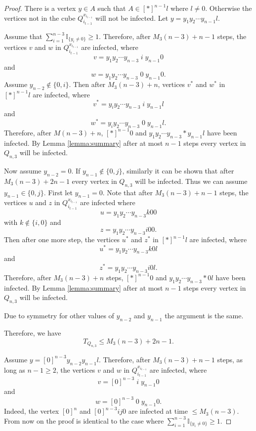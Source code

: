 \documentclass[10pt,a4paper]{amsart}
\renewcommand{\geq}{\geqslant}
\renewcommand{\leq}{\leqslant}
\begin{document}
\begin{proof}
There is a vertex $y \in A$ such that $A \in [\ast]^{n-1}l$ where $l \neq 0$. Otherwise the vertices not in the cube $Q_{i_{t-1}}^{x_{i_{t-1}}}$ will not be infected. Let $y=y_1y_2 \cdots y_{n-1}l$. 

Assume that $\sum_{i=1}^{n-3}\mathbb{I}_{\{y_i \neq 0\}} \geq 1$. Therefore, after $M_3(n-3)+n-1$ steps, the vertices $v$ and $w$ in $Q_{i_{t-1}}^{x_{i_{t-1}}}$ are infected, where 
$$v=y_1y_2\cdots y_{n-3}\;i\;y_{n-1}0$$
and 
$$w=y_1y_2\cdots y_{n-3}\;0\; y_{n-1}0.$$
Assume $y_{n-2} \notin \{0,i\}$. Then after $M_3(n-3)+n$, vertices $v^*$ and $w^*$ in $[\ast]^{n-1}l$ are infected, where 
$$v^*=y_iy_2 \cdots y_{n-3}\;i\;y_{n-1}l$$
and 
$$w^*=y_iy_2 \cdots y_{n-3}\;0\;y_{n-1}l. $$
Therefore, after $M(n-3)+n$, $[\ast]^{n-1}0$ and $y_1y_2\cdots y_{n-3}\ast y_{n-1}l$ have been infected. By Lemma \ref{lemma:summary} after at most $n-1$ steps every vertex in $Q_{n,3}$ will be infected. 

Now assume $y_{n-2}=0$. If $y_{n-1} \notin \{0,j\}$, similarly it can be shown that after $M_3(n-3)+2n-1$ every vertex in $Q_{n,3}$ will be infected. Thus we can assume $y_{n-1} \in \{0,j\}$. First let $y_{n-1}=0$. Note that after $M_3(n-3)+n-1$ steps, the vertices $u$ and $z$ in $Q_{i_{t-1}}^{x_{i_{t-1}}}$ are infected where 
$$u=y_1y_2 \cdots y_{n-3}k00$$
with $k \notin\{i,0\}$
and 
$$z=y_1y_2 \cdots y_{n-3}i00.$$
Then after one more step, the vertices $u^*$ and $z^*$ in $[\ast]^{n-1}l$ are infected, where 
$$u^*=y_1y_2 \cdots y_{n-3}k0l$$
and 
$$z^*=y_1y_2 \cdots y_{n-3}i0l.$$
Therefore, after $M_3(n-3)+n$ steps, $[\ast]^{n-1}0$ and $y_1y_2\cdots y_{n-3}\ast 0l$ have been infected. By Lemma \ref{lemma:summary} after at most $n-1$ steps every vertex in $Q_{n,3}$ will be infected. 

Due to symmetry for other values of $y_{n-2}$ and $y_{n-1}$ the argument is the same. 

Therefore, we have 
$$T_{Q_{n,3}} \leq M_3(n-3)+2n-1.$$

Assume $y=[0]^{n-3}y_{n-2}y_{n-1}l$. Therefore, after $M_3(n-3)+n-1$ steps, as long as $n-1 \geq 2$, the vertices $v$ and $w$ in $Q_{i_{t-1}}^{x_{i_{t-1}}}$ are infected, where 
$$v=[0]^{n-3}\;i\;y_{n-1}0$$
and 
$$w=[0]^{n-3}\;0\; y_{n-1}0.$$
Indeed, the vertex $[0]^n$ and $[0]^{n-3}ij0$ are infected at time $\leq M_3(n-3)$. From now on the proof is identical to the case where $\sum_{i=1}^{n-3}\mathbb{I}_{\{y_i \neq 0\}} \geq 1$. 








\end{proof}
\end{document}
